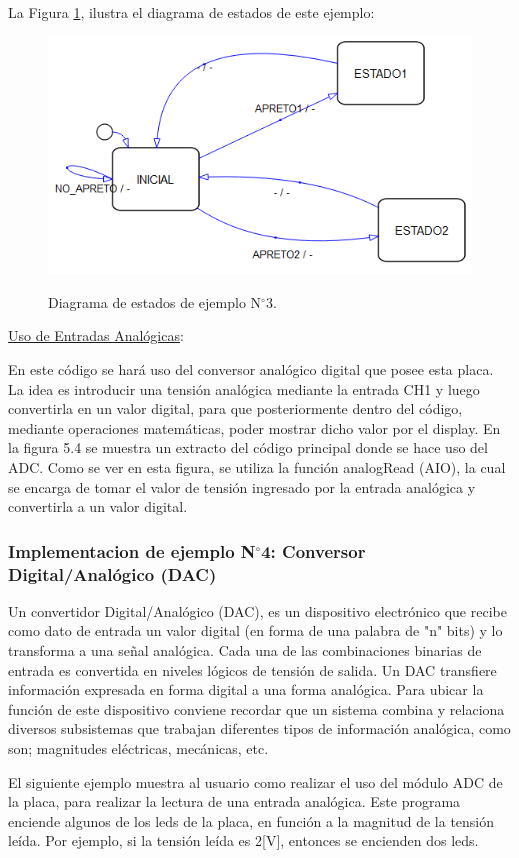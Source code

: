\documentclass[12pt,letterpaper]{article}
\begin{document}
La Figura \ref{Fig27}, ilustra el diagrama de estados de este ejemplo:

\begin{center}
\begin{figure}[!h]
\centering
\includegraphics[width=6 cm]{figuras/f9.png}\\
\caption{Diagrama de estados de ejemplo N$^{\circ}$3.}
\label{Fig27}
\end{figure}
\end{center}

\underline{Uso de Entradas Analógicas}:

En este código se hará uso del conversor analógico digital que posee esta placa. La idea es introducir una tensión analógica mediante la entrada CH1 y luego convertirla en un valor digital, para que posteriormente dentro del código, mediante operaciones matemáticas, poder mostrar dicho valor por el display.
En la figura 5.4 se muestra un extracto del código principal donde se hace uso del ADC. Como se ver en esta figura, se utiliza la función analogRead (AIO), la cual se encarga de tomar el valor de tensión ingresado por la entrada analógica y convertirla a un valor digital. 

\subsubsection{Implementacion de ejemplo N$^{\circ}$4: Conversor Digital/Analógico (DAC)}

Un convertidor Digital/Analógico (DAC), es un dispositivo electrónico que recibe como dato de entrada un valor digital (en forma de una palabra de "n" bits) y lo transforma a una señal analógica. Cada una de las combinaciones binarias de entrada es convertida en niveles lógicos de tensión de salida. Un DAC transfiere información expresada en forma digital a una forma analógica. Para ubicar la función de este dispositivo conviene recordar que un sistema combina y relaciona diversos subsistemas que trabajan diferentes tipos de información analógica, como son; magnitudes eléctricas, mecánicas, etc.

El siguiente ejemplo muestra al usuario como realizar el uso del módulo ADC de la placa, para realizar la lectura de una entrada analógica. Este programa enciende algunos de los leds de la placa, en función a la magnitud de la tensión leída. Por ejemplo, si la tensión leída es 2[V], entonces se encienden dos leds.
\end{document}
